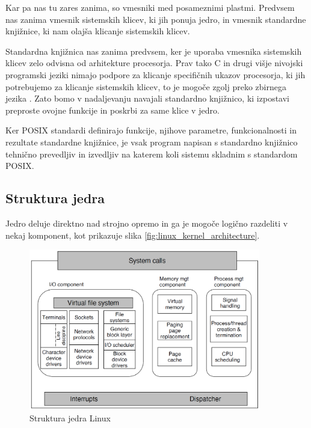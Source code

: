 \documentclass[a4paper,12pt,openright]{book}
\begin{document}
Kar pa nas tu zares zanima, so vmesniki med posameznimi plastmi.
Predvsem nas zanima vmesnik sistemskih klicev, ki jih ponuja jedro, in vmesnik standardne knjižnice, ki nam olajša klicanje sistemskih klicev.

Standardna knjižnica nas zanima predvsem, ker je uporaba vmesnika sistemskih klicev zelo odvisna od arhitekture procesorja.
Prav tako C in drugi višje nivojski programski jeziki nimajo podpore za klicanje specifičnih ukazov procesorja, ki jih potrebujemo za klicanje sistemskih klicev, to je mogoče zgolj preko zbirnega jezika \cite{Tanenbaum_Bos_2023}.
Zato bomo v nadaljevanju navajali standardno knjižnico, ki izpostavi preproste ovojne funkcije in poskrbi za same klice v jedro.

Ker POSIX standardi definirajo funkcije, njihove parametre, funkcionalnosti in rezultate standardne knjižnice, je vsak program napisan s standardno knjižnico tehnično prevedljiv in izvedljiv na katerem koli sistemu skladnim s standardom POSIX.

\subsection{Struktura jedra}

Jedro deluje direktno nad strojno opremo in ga je mogoče logično razdeliti v nekaj komponent, kot prikazuje slika \ref{fig:linux_kernel_architecture}.

\begin{figure}[h!]
	\begin{center}
		\includegraphics[width=0.9\textwidth]{images/linux_kernel_structure.png}
	\end{center}
	\caption{Struktura jedra Linux \cite{Tanenbaum_Bos_2023}}
	\label{fig:linux_kernel_structure}
\end{figure}
\end{document}
